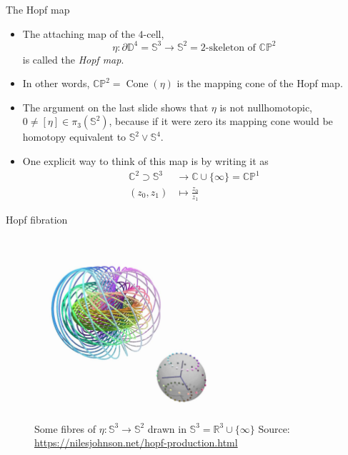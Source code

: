 \documentclass{beamer}
\newcommand{\sphere}[1]{\mathbb{S}^{#1}}
\newcommand{\disk}[1]{\mathbb{D}^{#1}}
\newcommand{\CP}[1]{\mathbb{CP}^{#1}}
\newcommand{\C}{\mathbb{C}}
\newcommand{\R}{\mathbb{R}}
\begin{document}
\begin{frame}{The Hopf map}

	\begin{itemize}
		\item The attaching map of the $4$-cell,
		\[
			\eta \colon \partial \disk{4} = \sphere{3} \rightarrow \sphere{2} = \textrm{2-skeleton of } \CP{2}
		\]
		is called the \textit{Hopf map}.
		
		\pause
		
		\item In other words, $\CP{2} = \operatorname{Cone}(\eta)$ is
		the mapping cone of the Hopf map.
		\item The argument on the last slide shows that $\eta$ is not nullhomotopic,
		$0 \ne [\eta] \in \pi_3(\sphere{2})$, because if it were zero its mapping cone would
		be homotopy equivalent to $\sphere{2} \vee \sphere{4}$.
		
		\pause
		
		\item One explicit way to think of this map is by writing it as
		\begin{align*}
			\C^{2} \supset \sphere{3} & \rightarrow \C \cup \{ \infty \} = \CP{1} \\
						   (z_0, z_1) & \mapsto \frac{z_0}{z_1}
		\end{align*}
	\end{itemize}

\end{frame}


\begin{frame}{Hopf fibration}
	\begin{figure}
		\includegraphics[width=0.6\textwidth]{pictures/hopf_fibration.jpg}
		\caption{
			\label{fig:hopf_fibration}
			Some fibres of $\eta \colon \sphere{3} \rightarrow \sphere{2}$
			drawn in $\sphere{3} = \R^{3} \cup \{ \infty \}$ \newline
			Source: \url{https://nilesjohnson.net/hopf-production.html}}
	\end{figure}
\end{frame}
\end{document}
